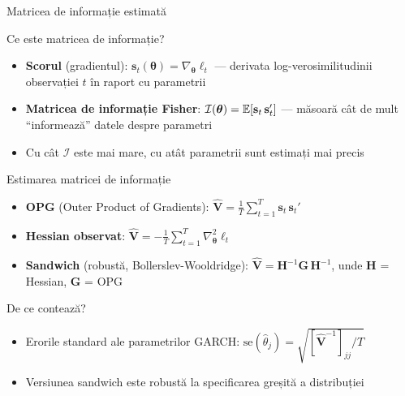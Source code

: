 \documentclass[9pt, aspectratio=169, t]{beamer}
\begin{document}
\begin{frame}{Matricea de informație estimată}
    \small
        \begin{block}{Ce este matricea de informație?}
            \begin{itemize}
                \item \textbf{Scorul} (gradientul): $\mathbf{s}_t(\boldsymbol{\theta}) = \nabla_{\boldsymbol{\theta}} \ell_t$ --- derivata log-verosimilitudinii observației $t$ în raport cu parametrii
                \item \textbf{Matricea de informație Fisher}: $\mathcal{I}(\boldsymbol{\theta}) = \mathbb{E}[\mathbf{s}_t \, \mathbf{s}_t']$ --- măsoară cât de mult ``informează'' datele despre parametri
                \item Cu cât $\mathcal{I}$ este mai mare, cu atât parametrii sunt estimați mai precis
            \end{itemize}
        \end{block}
        \vspace{-1mm}
        \begin{exampleblock}{Estimarea matricei de informație}
            \begin{itemize}
                \item \textbf{OPG} (Outer Product of Gradients): $\hat{\mathbf{V}} = \frac{1}{T}\sum_{t=1}^T \mathbf{s}_t \, \mathbf{s}_t'$
                \item \textbf{Hessian observat}: $\hat{\mathbf{V}} = -\frac{1}{T}\sum_{t=1}^T \nabla^2_{\boldsymbol{\theta}} \ell_t$
                \item \textbf{Sandwich} (robustă, Bollerslev-Wooldridge): $\hat{\mathbf{V}} = \mathbf{H}^{-1} \mathbf{G} \, \mathbf{H}^{-1}$, unde $\mathbf{H}$ = Hessian, $\mathbf{G}$ = OPG
            \end{itemize}
        \end{exampleblock}
        \vspace{-1mm}
        \begin{alertblock}{De ce contează?}
            \begin{itemize}
                \item Erorile standard ale parametrilor GARCH: $\text{se}(\hat{\theta}_j) = \sqrt{[\hat{\mathbf{V}}^{-1}]_{jj} / T}$
                \item Versiunea sandwich este robustă la specificarea greșită a distribuției
            \end{itemize}
        \end{alertblock}
\end{frame}
\end{document}
